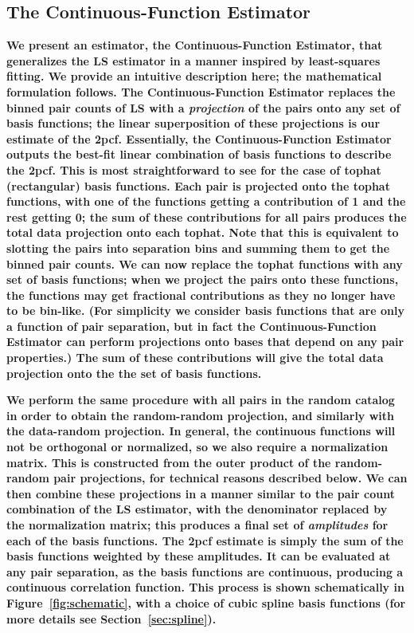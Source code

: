 \documentclass[modern]{aastex62}
\newcommand{\cf}{2pcf\xspace}
\newcommand{\Est}{The Continuous-Function Estimator\xspace}
\newcommand{\est}{the Continuous-Function Estimator\xspace}
\newcommand{\LS}{LS\xspace}
\newcommand{\new}[1]{\textbf{#1}}
\begin{document}
\subsection{\Est}
\label{sec:est}

\new{We present an estimator, \est, that generalizes the \LS estimator in a manner inspired by least-squares fitting.
We provide an intuitive description here; the mathematical formulation follows.
\Est replaces the binned pair counts of \LS with a \textit{projection} of the pairs onto any set of basis functions; the linear superposition of these projections is our estimate of the \cf.
Essentially, \est outputs the best-fit linear combination of basis functions to describe the \cf.
This is most straightforward to see for the case of tophat (rectangular) basis functions.
Each pair is projected onto the tophat functions, with one of the functions getting a contribution of 1 and the rest getting 0; the sum of these contributions for all pairs produces the total data projection onto each tophat.
Note that this is equivalent to slotting the pairs into separation bins and summing them to get the binned pair counts.
We can now replace the tophat functions with any set of basis functions; when we project the pairs onto these functions, the functions may get fractional contributions as they no longer have to be bin-like.
(For simplicity we consider basis functions that are only a function of pair separation, but in fact \est can perform projections onto bases that depend on any pair properties.)
The sum of these contributions will give the total data projection onto the the set of basis functions.}

\new{We perform the same procedure with all pairs in the random catalog in order to obtain the random-random projection, and similarly with the data-random projection.
In general, the continuous functions will not be orthogonal or normalized, so we also require a normalization matrix.
This is constructed from the outer product of the random-random pair projections, for technical reasons described below.
We can then combine these projections in a manner similar to the pair count combination of the \LS estimator, with the denominator replaced by the normalization matrix; this produces a final set of \textit{amplitudes} for each of the basis functions. 
The \cf estimate is simply the sum of the basis functions weighted by these amplitudes.
It can be evaluated at any pair separation, as the basis functions are continuous, producing a continuous correlation function. 
This process is shown schematically in Figure~\ref{fig:schematic}, with a choice of cubic spline basis functions (for more details see Section~\ref{sec:spline}).}
\end{document}
